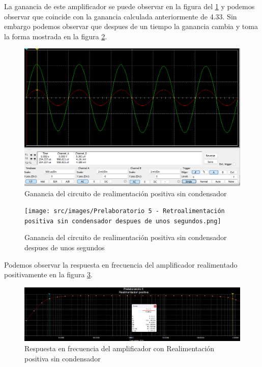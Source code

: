 \documentclass{article}
\begin{document}
La ganancia de este amplificador se puede observar en la figura del \ref{fig:ganancia-circuito-realimentacion-positiva-sin-condensador} y podemos observar que coincide con la ganancia calculada anteriormente de 4.33. Sin embargo podemos observar que despues de un tiempo la ganancia cambia y toma la forma mostrada en la figura \ref{fig:ganancia-circuito-realimentacion-positiva-sin-condensador-despues-de-unos-segundos}.

\begin{figure}[ht]
    \centering
    \includegraphics[width=\textwidth]{src/images/Prelaboratorio 5 - Realimentacion positiva sin condensador - ganancia.png}
    \caption{Ganancia del circuito de realimentación positiva sin condensador}
    \label{fig:ganancia-circuito-realimentacion-positiva-sin-condensador}
\end{figure}


\begin{figure}[ht]
    \centering
    \texttt{[image: src/images/Prelaboratorio 5 - Retroalimentación positiva sin condensador despues de unos segundos.png]}
    \caption{Ganancia del circuito de realimentación positiva sin condensador despues de unos segundos}
    \label{fig:ganancia-circuito-realimentacion-positiva-sin-condensador-despues-de-unos-segundos}
\end{figure}

Podemos observar la respuesta en frecuencia del amplificador realimentado positivamente en la figura \ref{fig:respuesta-amplificador-realimentacion-positiva-sin-condensador}.

\begin{figure}[ht]
    \centering
    \includegraphics[width=\textwidth]{src/images/Prelaboratorio 5 - realimentacion positiva sin condensador - respuesta en frecuencia.png}
    \caption{Respuesta en frecuencia del amplificador con Realimentación positiva sin condensador} 
    \label{fig:respuesta-amplificador-realimentacion-positiva-sin-condensador}
\end{figure}
\end{document}

